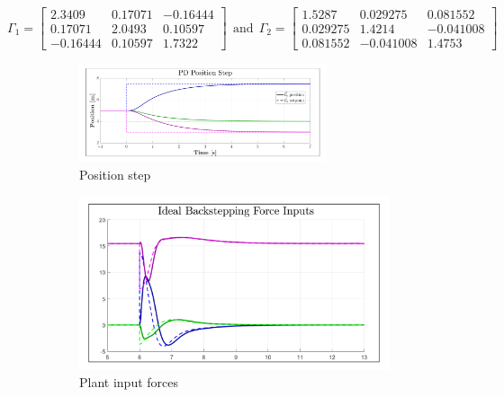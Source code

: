\begin{equation}\label{eq:optimized-Position-IBC}
\Gamma_1 = \begin{bmatrix}
2.3409 & 0.17071 & -0.16444\\
0.17071 & 2.0493 & 0.10597\\
-0.16444 & 0.10597 & 1.7322
\end{bmatrix}
~~\text{and}~~\Gamma_2= \begin{bmatrix}
1.5287 & 0.029275 & 0.081552\\
0.029275 & 1.4214 & -0.041008\\
0.081552 & -0.041008 & 1.4753
\end{bmatrix}
\end{equation}
\par
\begin{figure}[hbtp]
\vspace{-15pt}
\centering
\begin{subfigure}{\textwidth}
\centering
\includegraphics[width=0.8\textwidth]{graphs/IBC_Position_Step}
\caption{Position step}
\label{fig:IBC_Position_Step}
\end{subfigure}
\begin{subfigure}{0.49\textwidth}
\centering
\includegraphics[width=\textwidth]{graphs/IBC_Position_Force}
\caption{Plant input forces}
\label{fig:IBC_Position_Force}
\end{subfigure}
\begin{subfigure}{0.49\textwidth}

\end{subfigure}
\end{figure}
